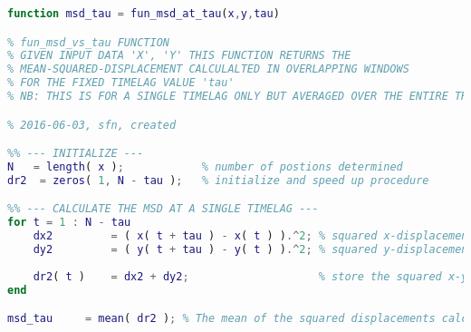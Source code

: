 \begin{lstlisting}[language=matlab]
function msd_tau = fun_msd_at_tau(x,y,tau)

% fun_msd_vs_tau FUNCTION
% GIVEN INPUT DATA 'X', 'Y' THIS FUNCTION RETURNS THE
% MEAN-SQUARED-DISPLACEMENT CALCULALTED IN OVERLAPPING WINDOWS
% FOR THE FIXED TIMELAG VALUE 'tau'
% NB: THIS IS FOR A SINGLE TIMELAG ONLY BUT AVERAGED OVER THE ENTIRE TRACK

% 2016-06-03, sfn, created

%% --- INITIALIZE ---
N   = length( x );            % number of postions determined
dr2  = zeros( 1, N - tau );   % initialize and speed up procedure

%% --- CALCULATE THE MSD AT A SINGLE TIMELAG ---
for t = 1 : N - tau
    dx2         = ( x( t + tau ) - x( t ) ).^2; % squared x-displacement
    dy2         = ( y( t + tau ) - y( t ) ).^2; % squared y-displacement
    
    dr2( t )    = dx2 + dy2;                    % store the squared x-y-displacement for each postion of the sliding window
end

msd_tau     = mean( dr2 ); % The mean of the squared displacements calculated in sliding windows

\end{lstlisting}